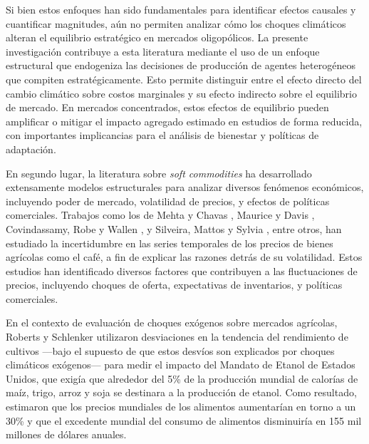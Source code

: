 Si bien estos enfoques han sido fundamentales para identificar efectos causales y cuantificar magnitudes, aún no permiten analizar cómo los choques climáticos alteran el equilibrio estratégico en mercados oligopólicos. La presente investigación contribuye a esta literatura mediante el uso de un enfoque estructural que endogeniza las decisiones de producción de agentes heterogéneos que compiten estratégicamente. Esto permite distinguir entre el efecto directo del cambio climático sobre costos marginales y su efecto indirecto sobre el equilibrio de mercado. En mercados concentrados, estos efectos de equilibrio pueden amplificar o mitigar el impacto agregado estimado en estudios de forma reducida, con importantes implicancias para el análisis de bienestar y políticas de adaptación.

En segundo lugar, la literatura sobre \textit{soft commodities} ha desarrollado extensamente modelos estructurales para analizar diversos fenómenos económicos, incluyendo poder de mercado, volatilidad de precios, y efectos de políticas comerciales. Trabajos como los de Mehta y Chavas \citeyearpar{mehta2008responding}, Maurice y Davis \citeyearpar{maurice2011unraveling}, Covindassamy, Robe y Wallen \citeyearpar{covindassamy2017sugar}, y Silveira, Mattos y Sylvia \citeyearpar{silveira2017reaction}, entre otros, han estudiado la incertidumbre en las series temporales de los precios de bienes agrícolas como el café, a fin de explicar las razones detrás de su volatilidad. Estos estudios han identificado diversos factores que contribuyen a las fluctuaciones de precios, incluyendo choques de oferta, expectativas de inventarios, y políticas comerciales.

En el contexto de evaluación de choques exógenos sobre mercados agrícolas, Roberts y Schlenker \citeyearpar{schlenker2009nonlinear} utilizaron desviaciones en la tendencia del rendimiento de cultivos —bajo el supuesto de que estos desvíos son explicados por choques climáticos exógenos— para medir el impacto del Mandato de Etanol de Estados Unidos, que exigía que alrededor del 5\% de la producción mundial de calorías de maíz, trigo, arroz y soja se destinara a la producción de etanol. Como resultado, estimaron que los precios mundiales de los alimentos aumentarían en torno a un 30\% y que el excedente mundial del consumo de alimentos disminuiría en 155 mil millones de dólares anuales.

